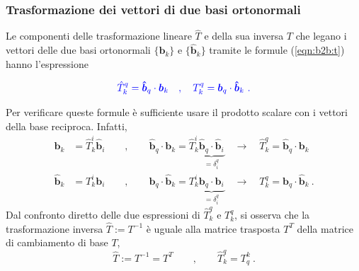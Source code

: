 \subsubsection{Trasformazione dei vettori di due basi ortonormali}
Le componenti delle trasformazione lineare $\hat{T}$ e della sua inversa $T$ che legano i vettori delle due basi ortonormali $\{\bm{b}_k\}$ e $\{\bm{\hat{b}}_k\}$ tramite le formule (\ref{eqn:b2b:t}) hanno l'espressione
\begin{fBox}
\begin{equation}
{\color{blue}
  \hat{T}^q_k = \bm{\hat{b}}_q \cdot \bm{b}_k \quad , \quad T^q_k = \bm{b}_q \cdot \bm{\hat{b}}_k \ .
}
\end{equation}
\end{fBox}
Per verificare queste formule è sufficiente usare il prodotto scalare con i vettori della base reciproca. Infatti,
{\color{blue}
\begin{equation}
\begin{aligned}
 \bm{b}_k & = \hat{T}^i_k \bm{\hat{b}}_i \qquad , \qquad 
 \bm{\hat{b}}_q \cdot \bm{b}_k = \hat{T}^i_k \underbrace{\bm{\hat{b}}_q \cdot \bm{\hat{b}}_i}_{=\delta^q_i} \quad \rightarrow  \quad \hat{T}^q_k = \bm{\hat{b}}_q \cdot \bm{b}_k \\
 \bm{\hat{b}}_k & = {T}^i_k \bm{b}_i \qquad , \qquad 
 \bm{b}_q \cdot \bm{\hat{b}}_k = T^i_k \underbrace{\bm{b}_q \cdot \bm{b}_i}_{=\delta^q_i} \quad \rightarrow  \quad T^q_k = \bm{b}_q \cdot \bm{\hat{b}}_k \ .
\end{aligned} 
\end{equation}
}
Dal confronto diretto delle due espressioni di $\hat{T}^q_k$ e $T^q_k$, si osserva che la trasformazione inversa $\hat{T}:=T^{-1}$ è uguale alla matrice trasposta $T^T$ della matrice di cambiamento di base $T$,
{\color{blue}
\begin{equation}
 \hat{T} := T^{-1} = T^T \qquad , \qquad \hat{T}^q_k = T^k_q \ .
\end{equation}
}


